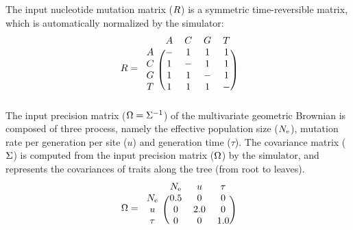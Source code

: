 \documentclass{article}
\begin{document}
	The input nucleotide mutation matrix ($R$) is a symmetric time-reversible matrix, which is automatically normalized by the simulator:
	\begin{equation}
		\Mutmatrix =
		\begin{blockarray}{ccccc}
			& A & C & G & T \\
			\begin{block}{c(cccc)}
				A & - & 1 & 1 & 1 \\
				C & 1 & - & 1 & 1 \\
				G & 1 & 1 & - & 1 \\
				T & 1 & 1 & 1 & - \\
			\end{block}
		\end{blockarray}
	\end{equation}
	The input precision matrix ($\Omega = \Sigma^{-1}$) of the multivariate geometric Brownian is composed of three process, namely the effective population size ($N_{\text{e}}$), mutation rate per generation per site ($u$) and generation time ($\tau$).
	The covariance matrix ($\Sigma$) is computed from the input precision matrix ($\Omega$) by the simulator, and represents the covariances of traits along the tree (from root to leaves).
	\begin{equation}
		\PrecisionMatrix =
		\begin{blockarray}{cccc}
			& \Ne & u & \tau \\
			\begin{block}{c(ccc)}
				\Ne  & 0.5 & 0 & 0 \\
				u    & 0 & 2.0 & 0 \\
				\tau & 0 & 0 & 1.0 \\
			\end{block}
		\end{blockarray}
	\end{equation}
\end{document}
